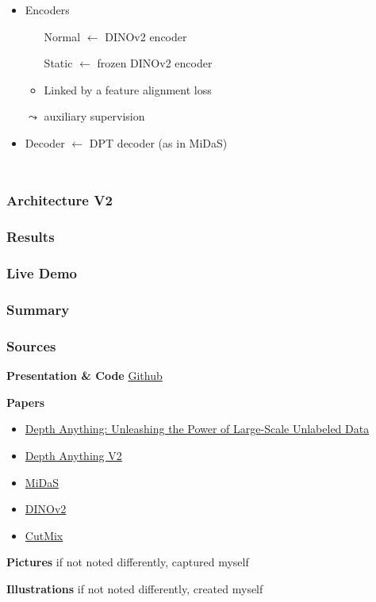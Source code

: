 \documentclass[12pt]{beamer}
\begin{document}
\begin{frame}
\begin{columns}
\begin{itemize}
            \item<3-> Encoders
            \begin{itemize}
                \item[Normal] $\leftarrow$ DINOv2 encoder
                \item[Static] $\leftarrow$ frozen DINOv2 encoder
                \item Linked by a feature alignment loss
            \end{itemize}
            $\leadsto$ auxiliary supervision
            
            \item<4-> Decoder $\leftarrow$ DPT decoder (as in MiDaS)
            
        \end{itemize}
    \end{columns}
    
\end{frame}

\begin{frame}
    \frametitle{Architecture V2}
\end{frame}


\begin{frame}
    \frametitle{Results}
\end{frame}

\begin{frame}
    \frametitle{Live Demo}
    
\end{frame}

\begin{frame}
    \frametitle{Summary}
\end{frame}


\begin{frame}
    \frametitle{Sources}
    \tiny
    
    \textbf{Presentation \& Code} \href{https://github.com/birawaich/thu_mavi_paperpresentation}{Github}
    
    \textbf{Papers}
    \begin{itemize}
        \item \href{https://arxiv.org/abs/2401.10891}{Depth Anything: Unleashing the Power of Large-Scale Unlabeled Data}
        \item \href{https://arxiv.org/abs/2406.09414}{Depth Anything V2}
        \item \href{https://arxiv.org/abs/1907.01341}{MiDaS}
        \item \href{https://arxiv.org/abs/2304.07193}{DINOv2}
        \item \href{https://arxiv.org/abs/1905.04899}{CutMix}
    \end{itemize}
    
    \textbf{Pictures}
    if not noted differently, captured myself
    
    \textbf{Illustrations}
    if not noted differently, created myself
    
    
\end{frame}
\end{document}
